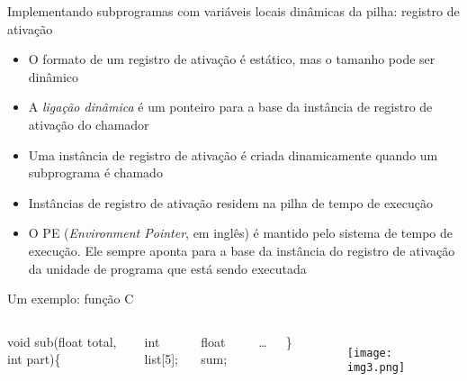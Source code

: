 \documentclass[10pt]{beamer}
\begin{document}
\begin{frame}{Implementando subprogramas com variáveis locais dinâmicas da pilha: registro de ativação}
\begin{itemize}
	\item O formato de um registro de ativação é estático, mas o tamanho pode ser dinâmico
	\item A \textit{ligação dinâmica} é um ponteiro para a base da instância de registro de ativação do chamador
	\item Uma instância de registro de ativação é criada dinamicamente quando um subprograma é chamado
	\item Instâncias de registro de ativação residem na pilha de tempo de execução
	\item O PE (\textit{Environment Pointer}, em inglês) é mantido pelo sistema de tempo de execução. Ele sempre aponta para a base da instância do registro de ativação da unidade de programa que está sendo executada
\end{itemize}
\end{frame}
\begin{frame}{Um exemplo: função C}

\begin{columns}[T,onlytextwidth]
	
    	void sub(float total, int part)\{
    
    \hspace{1cm} int list[5];
        
    \hspace{1cm} float sum;
        
    \hspace{1cm} …
        
    \}
	
    \begin{figure}
      \texttt{[image: img3.png]}
    \end{figure}
\end{columns}
\end{frame}
\end{document}
